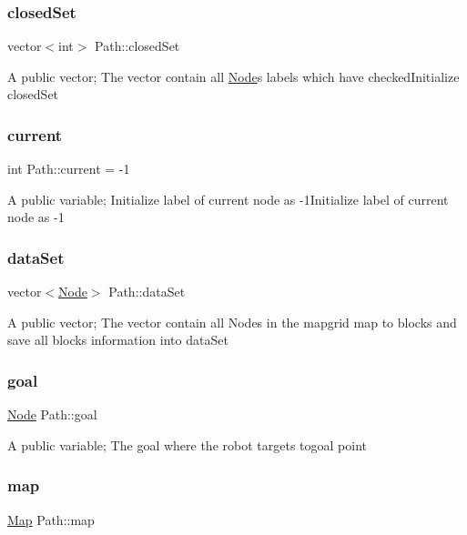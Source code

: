 \subsubsection{\texorpdfstring{closed\+Set}{closedSet}}
{\footnotesize\ttfamily vector$<$int$>$ Path\+::closed\+Set}

A public vector; The vector contain all \hyperlink{classNode}{Node}\textquotesingle{}s labels which have checked\+Initialize closed\+Set \mbox{\label{classPath_a3070eec5809bb39f9738b1025a9b567f}} 
\subsubsection{\texorpdfstring{current}{current}}
{\footnotesize\ttfamily int Path\+::current = -\/1}

A public variable; Initialize label of current node as -\/1\+Initialize label of current node as -\/1 \mbox{\label{classPath_a7aea225a45024d0b947d9095a5bd845e}} 
\subsubsection{\texorpdfstring{data\+Set}{dataSet}}
{\footnotesize\ttfamily vector$<$\hyperlink{classNode}{Node}$>$ Path\+::data\+Set}

A public vector; The vector contain all Nodes in the mapgrid map to blocks and save all blocks information into data\+Set \mbox{\label{classPath_a84f44ef4fe5af14812dfcbc9f8625fc1}} 
\subsubsection{\texorpdfstring{goal}{goal}}
{\footnotesize\ttfamily \hyperlink{classNode}{Node} Path\+::goal}

A public variable; The goal where the robot targets togoal point \mbox{\label{classPath_ac69916a76b41530a848ceb3238b82441}} 
\subsubsection{\texorpdfstring{map}{map}}
{\footnotesize\ttfamily \hyperlink{classMap}{Map} Path\+::map}

